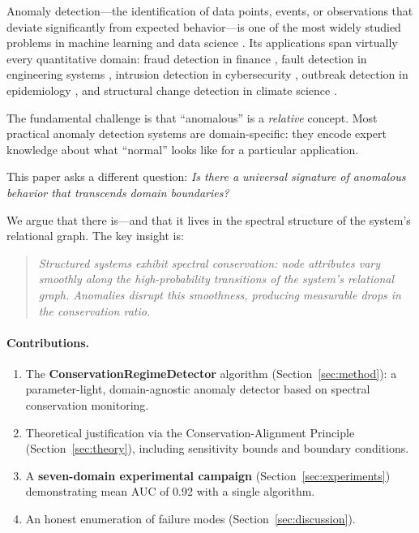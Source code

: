 \documentclass[11pt,a4paper]{article}
\begin{document}
Anomaly detection---the identification of data points, events, or observations
that deviate significantly from expected behavior---is one of the most widely
studied problems in machine learning and data science
\citep{chandola2009anomaly, chalapathy2018deep, ruff2021unifying}.
Its applications span virtually every quantitative domain: fraud detection in
finance \citep{bolton2002statistical}, fault detection in engineering systems
\citep{gertler1988survey}, intrusion detection in cybersecurity
\citep{chandola2009anomaly}, outbreak detection in epidemiology
\citep{wong2003wsare}, and structural change detection in climate science
\citep{reeves2007review}.

The fundamental challenge is that ``anomalous'' is a \emph{relative} concept.
Most practical anomaly detection systems are domain-specific: they encode expert
knowledge about what ``normal'' looks like for a particular application.

This paper asks a different question: \emph{Is there a universal signature of
anomalous behavior that transcends domain boundaries?}

We argue that there is---and that it lives in the spectral structure of the
system's relational graph.  The key insight is:

\begin{quote}
\emph{Structured systems exhibit spectral conservation: node attributes vary
smoothly along the high-probability transitions of the system's relational graph.
Anomalies disrupt this smoothness, producing measurable drops in the conservation
ratio.}
\end{quote}

\paragraph{Contributions.}
\begin{enumerate}[leftmargin=*,itemsep=2pt]
  \item The \textbf{ConservationRegimeDetector} algorithm (Section~\ref{sec:method}):
        a parameter-light, domain-agnostic anomaly detector based on spectral
        conservation monitoring.
  \item Theoretical justification via the Conservation-Alignment Principle
        (Section~\ref{sec:theory}), including sensitivity bounds and boundary
        conditions.
  \item A \textbf{seven-domain experimental campaign} (Section~\ref{sec:experiments})
        demonstrating mean AUC of 0.92 with a single algorithm.
  \item An honest enumeration of failure modes (Section~\ref{sec:discussion}).
\end{enumerate}
\end{document}
